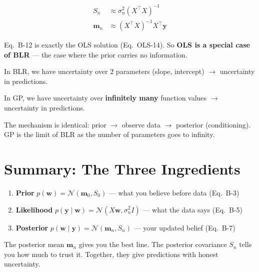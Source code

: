 \documentclass[11pt, a4paper]{article}
\newcommand{\bridge}[1]{\begin{tcolorbox}[colback=lightgreen, colframe=green!40, title=Bridge to GP]#1\end{tcolorbox}}
\begin{document}
\begin{align}
S_n &\approx \sigma_n^2 (X^\top X)^{-1} \tag{B-11} \\
\mathbf{m}_n &\approx (X^\top X)^{-1} X^\top \mathbf{y} \tag{B-12}
\end{align}

Eq.~B-12 is exactly the OLS solution (Eq.~OLS-14). So \textbf{OLS is a special case of BLR} --- the case where the prior carries no information.

\bridge{
In BLR, we have uncertainty over 2 parameters (slope, intercept) $\rightarrow$ uncertainty in predictions.

In GP, we have uncertainty over \textbf{infinitely many} function values $\rightarrow$ uncertainty in predictions.

The mechanism is identical: prior $\rightarrow$ observe data $\rightarrow$ posterior (conditioning). GP is the limit of BLR as the number of parameters goes to infinity.
}


\section*{\color{secblue}Summary: The Three Ingredients}

\begin{enumerate}
\item \textbf{Prior} $p(\mathbf{w}) = \mathcal{N}(\mathbf{m}_0, S_0)$ --- what you believe before data \hfill (Eq.~B-3)
\item \textbf{Likelihood} $p(\mathbf{y} \mid \mathbf{w}) = \mathcal{N}(X\mathbf{w}, \sigma_n^2 I)$ --- what the data says \hfill (Eq.~B-5)
\item \textbf{Posterior} $p(\mathbf{w} \mid \mathbf{y}) = \mathcal{N}(\mathbf{m}_n, S_n)$ --- your updated belief \hfill (Eq.~B-7)
\end{enumerate}

The posterior mean $\mathbf{m}_n$ gives you the best line. The posterior covariance $S_n$ tells you how much to trust it. Together, they give predictions with honest uncertainty.
\end{document}
